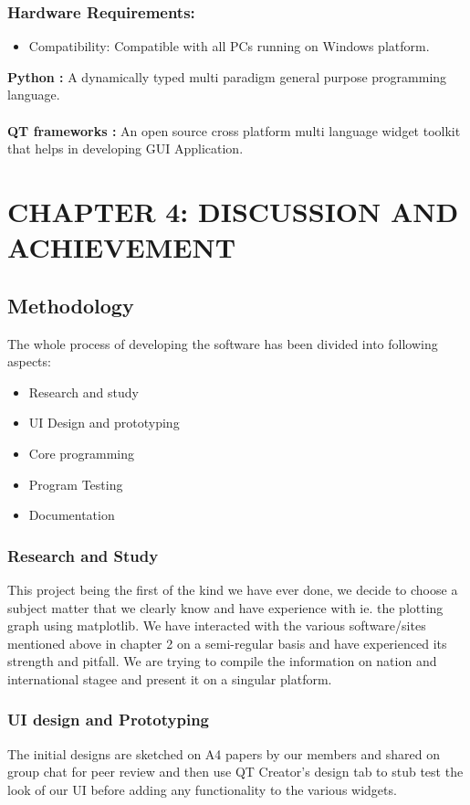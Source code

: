 \documentclass[12pt]{article}
\begin{document}
\subsubsection{Hardware Requirements:}
\begin{itemize}
    \item Compatibility: Compatible with all PCs running on Windows platform.
\end{itemize}

\vspace*{10mm}
\textbf{Python :} A dynamically typed multi paradigm general purpose programming language.
\\\\
\textbf{QT frameworks :} An open source cross platform multi language widget toolkit that helps in developing GUI Application.

\clearpage
\section{CHAPTER 4: DISCUSSION AND  ACHIEVEMENT}

\subsection{Methodology}
The whole process of developing the software has been divided into following aspects:
\begin{itemize}
    \item Research and study
    \item UI Design and prototyping
    \item Core programming
    \item Program Testing
    \item Documentation
\end{itemize}

\subsubsection{Research and Study}
This project being the first of the kind we have ever done, we decide to choose a subject matter that we clearly know and have experience with ie. the plotting graph 
using matplotlib. We have interacted with the various software/sites mentioned above in chapter 2 on a semi-regular basis and have experienced its strength 
and pitfall. We are trying to compile the information on nation and international stagee and present it on a singular platform.

\subsubsection{UI design and Prototyping}
The initial designs are sketched on A4 papers by our members and shared on group chat for peer review and then use QT Creator’s design tab to stub test the look 
of our UI before adding any functionality to the various widgets.
\end{document}

